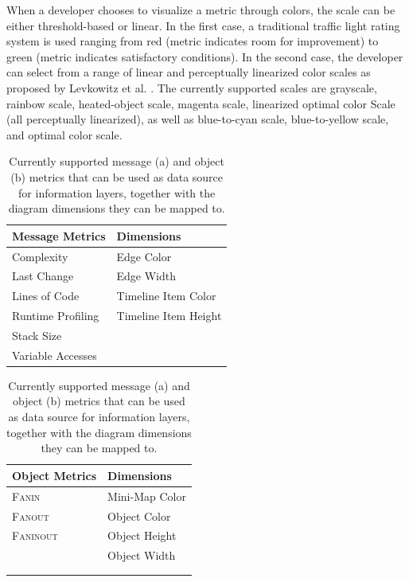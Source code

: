 When a developer chooses to visualize a metric through colors, the scale can be either threshold-based or linear.
In the first case, a traditional traffic light rating system is used ranging from red (metric indicates room for improvement) to green (metric indicates satisfactory conditions).
In the second case, the developer can select from a range of linear and perceptually linearized color scales as proposed by Levkowitz et al. \cite{levkowitz_color_1992, levkowitz_color_1997}.
The currently supported scales are grayscale, rainbow scale, heated-object scale, magenta scale, linearized optimal color Scale (all perceptually linearized), as well as blue-to-cyan scale, blue-to-yellow scale, and optimal color scale.

\begin{table}[tb]
	\centering
	\footnotesize
	\begin{subtable}[t]{0.45\textwidth}
		\begin{tabular}{ll}
		\toprule[1.2pt]
		Message Metrics		& Dimensions 			\\
		\midrule
		Complexity			& Edge Color 			\\
		Last Change			& Edge Width			\\
		Lines of Code		& Timeline Item Color	\\
		Runtime Profiling	& Timeline Item Height	\\
		Stack Size			&						\\
		Variable Accesses	&						\\
		\bottomrule[1.2pt]
		\end{tabular}
		\caption[Message Metrics]{}
	\end{subtable}
	\qquad
	\begin{subtable}[t]{0.45\textwidth}
		\begin{tabular}{ll}
		\toprule[1.2pt]
		Object Metrics		& Dimensions 			\\
		\midrule
		\textsc{Fanin}		& Mini-Map Color		\\
		\textsc{Fanout}		& Object Color			\\
		\textsc{Faninout}	& Object Height			\\
		\hphantom{Runtime Profiling}	& Object Width			\\
							& \hphantom{Timeline Item Height} \\
							& \\
		\bottomrule[1.2pt]
		\end{tabular}
		\caption[Object Metrics]{}
	\end{subtable}
	\caption[Information Layers: Supported Metrics and Diagram Dimensions]{Currently supported message (a) and object (b) metrics that can be used as data source for information layers, together with the diagram dimensions they can be mapped to.}
	\label{t:ImplementationLayers}
\label{t:EvaluationProjects}
\end{table}


